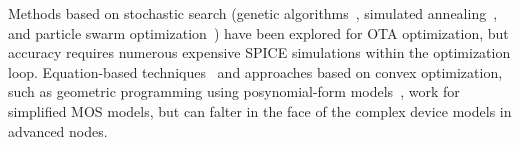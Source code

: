 Methods based on stochastic search (genetic algorithms~\cite{koza_96, Kruiskamp_95}, simulated annealing~\cite{gielen_90}, 
and particle swarm optimization~\cite{vural_12}) have been explored for OTA optimization, but accuracy requires numerous expensive SPICE simulations within the optimization loop.
Equation-based techniques~\cite{abel_22, abel_22_2} and approaches based on convex optimization, such as geometric programming using posynomial-form models~\cite{hershenson_01}, work for simplified MOS models, but can falter in the face of the complex device models in advanced nodes. 
